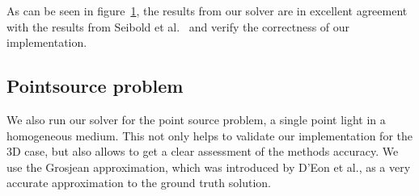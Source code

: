 \begin{figure}[h]
\begin{subfigure}{0.49\columnwidth}
\end{subfigure}%
\vspace{-0.1in}
\label{fig:vs_starmap}
\end{figure}

As can be seen in figure~\ref{fig:vs_starmap}, the results from our solver are in excellent agreement with the results from Seibold et al.~\cite{Seibold14} and verify the correctness of our implementation.

\subsection{Pointsource problem}

We also run our solver for the point source problem, a single point light in a homogeneous medium. This not only helps to validate our implementation for the 3D case, but also allows to get a clear assessment of the methods accuracy. We use the Grosjean approximation, which was introduced by D'Eon et al.\cite{dEon11}, as a very accurate approximation to the ground truth solution.

